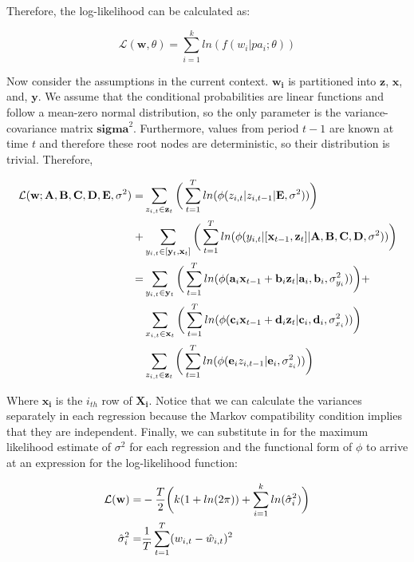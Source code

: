 \documentclass{article}
\begin{document}
Therefore, the log-likelihood can be calculated as:

\begin{equation}
  \mathcal{L}(\mathbf{w},\theta) = \sum_{i=1}^{k} ln(f(w_i | pa_i;\theta))
\end{equation}

Now consider the assumptions in the current context. $\mathbf{w_i}$ is partitioned into $\mathbf{z}$, $\mathbf{x}$, and, $\mathbf{y}$. We assume that the conditional probabilities are linear functions and follow a mean-zero normal distribution, so the only parameter is the variance-covariance matrix $\mathbf{sigma}^2$. Furthermore, values from period $t-1$ are known at time $t$ and therefore these root nodes are deterministic, so their distribution is trivial. Therefore,

\begin{align}
  \mathcal{L}(\mathbf{w}; \mathbf{A}, \mathbf{B}, \mathbf{C}, \mathbf{D}, \mathbf{E}, \mathbf{\sigma}^2) =& \sum_{z_{i,t} \in \mathbf{z}_t} \bigg{(} \sum_{t=1}^{T} ln(\phi(z_{i,t} | z_{i,t-1} | \mathbf{E}, \mathbf{\sigma}^2)) \bigg{)} \nonumber\\
  +& \sum_{y_{i,t} \in [\mathbf{y}_t,\mathbf{x}_t]} \bigg{(} \sum_{t=1}^{T} ln(\phi(y_{i,t} | [\mathbf{x}_{t-1}, \mathbf{z}_{t}] | \mathbf{A}, \mathbf{B}, \mathbf{C}, \mathbf{D}, \mathbf{\sigma}^2)) \bigg{)} \\
  =& \sum_{y_{i,t} \in \mathbf{y}_t} \bigg{(} \sum_{t=1}^{T} ln(\phi(\mathbf{a}_i \mathbf{x}_{t-1} + \mathbf{b}_i \mathbf{z}_t | \mathbf{a}_i, \mathbf{b}_i, \sigma_{y_i}^2)) \bigg{)} + \nonumber\\
  & \sum_{x_{i,t} \in \mathbf{x}_t} \bigg{(} \sum_{t=1}^{T} ln(\phi(\mathbf{c}_i \mathbf{x}_{t-1} + \mathbf{d}_i \mathbf{z}_t | \mathbf{c}_i, \mathbf{d}_i, \sigma_{x_i}^2)) \bigg{)} \nonumber\\
  & \sum_{z_{i,t} \in \mathbf{z}_t} \bigg{(} \sum_{t=1}^{T} ln(\phi(\mathbf{e}_i z_{i,t-1}  | \mathbf{e}_i, \sigma_{z_i}^2)) \bigg{)}
\end{align}

Where $\mathbf{x_i}$ is the $i_{th}$ row of $\mathbf{X_i}$. Notice that we can calculate the variances separately in each regression because the Markov compatibility condition implies that they are independent. Finally, we can substitute in for the maximum likelihood estimate of $\sigma^2$ for each regression and the functional form of $\phi$ to arrive at an expression for the log-likelihood function:

\begin{align}
  \mathcal{L(\mathbf{w})} =& -\frac{T}{2} \bigg{(} 
  k (1 + ln(2\pi)) 
  + \sum_{i=1}^{k} ln(\hat{\sigma}_{i}^2)
  \bigg{)} \\
  \hat{\sigma}_{i}^2 =& \frac{1}{T} \sum_{t=1}^{T} (w_{i,t} - \hat{w}_{i,t})^2
\end{align}
\end{document}
